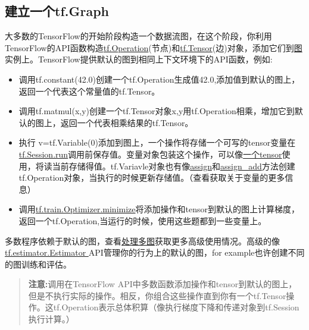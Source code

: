 \subsection{建立一个tf.Graph}
大多数的TensorFlow的开始阶段构造一个数据流图，在这个阶段，你利用TensorFlow的API函数构造\href{https://www.tensorflow.org/api_docs/python/tf/Operation?hl=zh-cn}{tf.Operation}(节点)和\href{https://www.tensorflow.org/api_docs/python/tf/Tensor?hl=zh-cn}{tf.Tensor}(边)对象，添加它们到\href{https://www.tensorflow.org/api_docs/python/tf/Graph?hl=zh-cn}{图}实例上。TensorFlow提供默认的图到相同上下文环境下的API函数，例如:
\begin{itemize}
\item 调用tf.constant(42.0)创建一个tf.Operation生成值42.0,添加值到默认的图上，返回一个代表这个常量值的tf.Tensor。
\item 调用tf.matmul(x,y)创建一个tf.Tensor对象x,y用tf.Operation相乘，增加它到默认的图上，返回一个代表相乘结果的tf.Tensor。
\item 执行 v=tf.Variable(0)添加到图上，一个操作将存储一个可写的tensor变量在\href{https://www.tensorflow.org/api_docs/python/tf/Session?hl=zh-cn#run}{tf.Session.run}调用前保存值。变量对象包装这个操作，可以像\href{https://www.tensorflow.org/programmers_guide/graphs?hl=zh-cn#tensor-like-objects}{一个tensor}使用，将读当前存储得值。tf.Variavle对象也有像\href{https://www.tensorflow.org/api_docs/python/tf/Variable?hl=zh-cn#assign}{assign}和\href{https://www.tensorflow.org/api_docs/python/tf/Variable?hl=zh-cn#assign_add}{assign\_add}方法创建tf.Operation对象，当执行的时候更新存储值。（查看获取关于变量的更多信息）
\item 调用\href{https://www.tensorflow.org/api_docs/python/tf/train/Optimizer?hl=zh-cn#minimize}{tf.train.Optimizer.minimize}将添加操作和tensor到默认的图上计算梯度，返回一个tf.Operation,当运行的时候，使用这些题都到一些变量上。
\end{itemize}
多数程序依赖于默认的图，查看\href{https://www.tensorflow.org/programmers_guide/graphs?hl=zh-cn#dealing_with_multiple_graphs}{处理多图}获取更多高级使用情况。高级的像\href{https://www.tensorflow.org/api_docs/python/tf/estimator/Estimator?hl=zh-cn}{ tf.estimator.Estimator }API管理你的行为上的默认的图，for example也许创建不同的图训练和评估。
\begin{quote}
	\textbf{注意:}调用在TensorFlow API中多数函数添加操作和tensor到默认的图上，但是不执行实际的操作。相反，你组合这些操作直到你有一个tf.Tensor操作。这tf.Operation表示总体积算（像执行梯度下降和传递对象到tf.Session执行计算。）
\end{quote}
